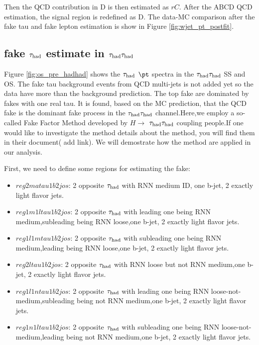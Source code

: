 Then the QCD contribution in D is then estimated as $rC$. After the ABCD QCD estimation, the signal region is redefined as D.
The data-MC comparison after the fake tau and fake lepton estimation is show in Figure \ref{fig:wjet_pt_postfit}.


\subsection{fake $\tau_\text{had}$ estimate in $\tau_\text{had}{}\tau_\text{had}$}
\label{sec:ss_method}

Figure \ref{fig:os_pre_hadhad} shows the $\tau_\text{had}$ $\pt$ spectra in the $\tau_\text{had}{}\tau_\text{had}$ SS and OS. The fake tau background events from QCD multi-jets 
is not added yet so the data have more than the background prediction. The top fake are dominated by fakes with one real tau.
It is found, based on the MC prediction, that the QCD fake is the dominant fake process in the $\tau_\text{had}{}\tau_\text{had}$ channel.Here,we employ a so-called Fake Factor Method developed by  $H\rightarrow$ $\tau_\text{had}{}\tau_\text{had}$ coupling people.If one would like to  investigate the method details about the method,  you will find them in their document( add link). We will demostrate how the method are applied in our analysis.

First, we need to define some regions for estimating the fake:

\begin{itemize}
\item{$reg2matau1b2jos$:   2 opposite $\tau_\text{had}$  with RNN medium ID, one b-jet, 2 exactly light flavor jets.}
\item{$reg1m1ltau1b2jos$:  2 opposite $\tau_\text{had}$  with leading one being RNN medium,subleading being  RNN loose,one b-jet, 2 exactly light flavor jets.}
\item{$reg1l1mtau1b2jos$:  2 opposite $\tau_\text{had}$  with subleading one being RNN medium,leading being  RNN loose,one b-jet, 2 exactly light flavor jets.}
\item{$reg2ltau1b2jos$:    2 opposite $\tau_\text{had}$  with RNN loose but not RNN medium,one b-jet, 2 exactly light flavor jets.}
\item{$reg1l1ntau1b2jos$:  2 opposite $\tau_\text{had}$  with leading one being RNN loose-not-medium,subleading being not RNN medium,one b-jet, 2 exactly light flavor jets.}
\item{$reg1n1ltau1b2jos$:  2 opposite $\tau_\text{had}$  with subleading one being RNN loose-not-medium,leading being not RNN medium,one b-jet, 2 exactly light flavor jets.}
\end{itemize}

